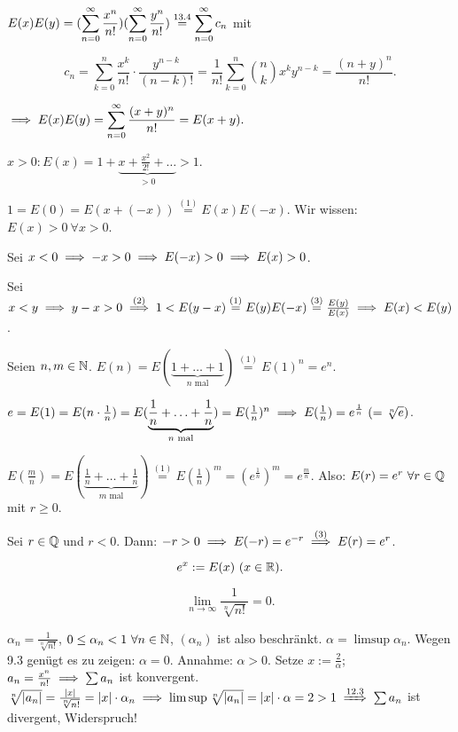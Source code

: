 \documentclass[a4paper,twoside,DIV15,BCOR12mm]{scrbook}
\begin{document}
\begin{beweise}
\item $\displaystyle{E(x)E(y) = (\sum_{n=0}^{\infty}{\frac{x^n}{n!}})(\sum_{n=0}^{\infty}{\frac{y^n}{n!}}) \overset{\text{13.4}}{=} \sum_{n=0}^{\infty}{c_n}}$ mit

$$c_n = \sum_{k=0}^{n}{\frac{x^k}{n!}\cdot\frac{y^{n-k}}{(n-k)!}} = \frac{1}{n!} \sum_{k=0}^{n}{\binom{n}{k} x^k y^{n-k}} = \frac{(n+y)^n}{n!}.$$

$\displaystyle{\ensuremath{\implies}E(x)E(y) = \sum_{n=0}^{\infty}{\frac{(x+y)^n}{n!}} = E(x+y).}$

\item $x>0: E(x) = 1+\underbrace{x+\frac{x^2}{2!}+\ldots}_{>0} > 1$.

\item $1 = E(0) = E(x+(-x)) \overset{(1)}{=} E(x)E(-x)$. Wir wissen: $E(x)>0\ \forall x>0$.

Sei $x<0 \implies -x>0 \implies E(-x)>0 \implies E(x)>0$.

\item Sei $x<y \implies y-x>0 \overset{(2)}{\implies} 1<E(y-x) \overset{(1)}{=} E(y)E(-x) \overset{(3)}{=} \frac{E(y)}{E(x)} \implies E(x)<E(y)$.

\item Seien $n,m\in\mathbb{N}$. $E(n) = E(\underbrace{1+\ldots+1}_{n\text{ mal}}) \overset{(1)}{=} E(1)^n = e^n$.

$e = E(1) = E(n\cdot\frac{1}{n}) = E(\underbrace{\frac{1}{n}+\ldots+\frac{1}{n}}_{n\text{ mal}}) = E(\frac{1}{n})^n \implies E(\frac{1}{n}) = e^{\frac{1}{n}}\ (= \sqrt[n]{e})$.

$E(\frac{m}{n}) = E(\underbrace{\frac{1}{n}+\ldots+\frac{1}{n}}_{m\text{ mal}}) \overset{(1)}{=} E(\frac{1}{n})^m = (e^{\frac{1}{n}})^m = e^{\frac{m}{n}}$. Also: $E(r) = e^r\ \forall r\in\mathbb{Q}$ mit $r \ge 0$.

Sei $r\in\mathbb{Q}$ und $r<0$. Dann: $-r>0 \implies E(-r) = e^{-r} \overset{(3)}{\implies} E(r) = e^r$.
\end{beweise}

\begin{definition}[$e^x$]
\begin{equation*}
e^x := E(x)\ (x\in\mathbb{R}).
\end{equation*}
\end{definition}

\begin{wichtigerhilfssatz}
$$\lim_{n\to\infty}{\frac{1}{\sqrt[n]{n!}}} = 0.$$
\end{wichtigerhilfssatz}

\begin{beweis}
$\alpha_n = \frac{1}{\sqrt[n]{n!}}$, $0\le \alpha_n<1 \ \forall n\in\mathbb{N}$, $(\alpha_n)$ ist also beschränkt.
$\alpha = \limsup \alpha_n$. Wegen 9.3 genügt es zu zeigen: $\alpha = 0$. Annahme: $\alpha > 0$. Setze $x:= \frac{2}{\alpha}$; $a_n = \frac{x^n}{n!} \implies \sum{a_n}$ ist konvergent. $\sqrt[n]{|a_n|} = \frac{|x|}{\sqrt[n]{n!}} = |x|\cdot\alpha_n \folgt \limsup \sqrt[n]{|a_n|} = |x|\cdot\alpha = 2>1 \folgtnach{12.3} \sum{a_n}$ ist divergent, Widerspruch!
\end{beweis}
\end{document}

